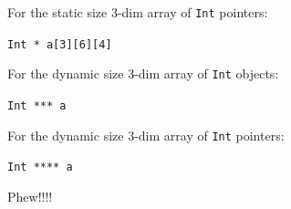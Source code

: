 For the static size 3-dim array of \texttt{Int} pointers:

\begin{center}

\texttt{Int * a[3][6][4]}

\end{center}

For the dynamic size 3-dim array of \texttt{Int} objects:

\begin{center}

\texttt{Int *** a}

\end{center}

For the dynamic size 3-dim array of \texttt{Int} pointers:

\begin{center}

\texttt{Int **** a}

\end{center}

Phew!!!!

